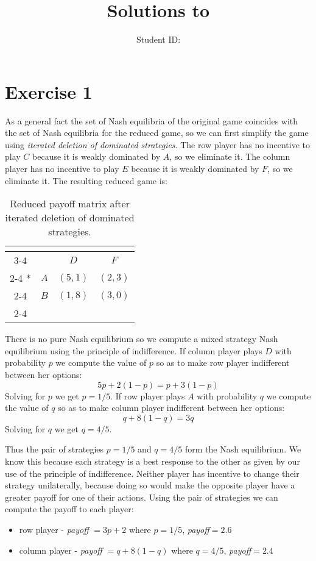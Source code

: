 \documentclass{article}
\title{\textbf{Solutions to \exerciseset}}
\author{\studentname \qquad Student ID: \uwid}
\begin{document}
\maketitle

\section*{Exercise 1}

As a general fact the set of Nash equilibria of the original game coincides with the set of Nash equilibria for the reduced game, so we can first simplify the game using \emph{iterated deletion of dominated strategies}. The row player has no incentive to play $C$ because it is weakly dominated by $A$, so we eliminate it. The column player has no incentive to play $E$ because it is weakly dominated by $F$, so we eliminate it. The resulting reduced game is:

\begin{table}[H]
\centering
  \setlength{\extrarowheight}{2pt}
  \begin{tabular}{*{4}{c|}}
    \multicolumn{2}{c}{} & \multicolumn{2}{c}{}\\\cline{3-4}
    \multicolumn{1}{c}{} &  & $D$  & $F$ \\\cline{2-4}
    \multirow{2}*{}  & $A$ & $(5,1)$ & $(2,3)$ \\\cline{2-4}
    & $B$ & $(1,8)$ & $(3,0)$ \\\cline{2-4}
  \end{tabular}
\caption{Reduced payoff matrix after iterated deletion of dominated strategies.}
\end{table}

There is no pure Nash equilibrium so we compute a mixed strategy Nash equilibrium using the principle of indifference.
If column player plays $D$ with probability $p$ we compute the value of $p$ so as to make row player indifferent between her options:
\[ 5p + 2(1 - p) = p + 3(1 - p) \]
Solving for $p$ we get $p = 1/5$. If row player plays $A$ with probability $q$ we compute the value of $q$ so as to make column player indifferent between her options:
\[ q + 8(1 - q) = 3q \]
Solving for $q$ we get $q = 4/5$.

Thus the pair of strategies $p = 1/5$ and $q = 4/5$ form the Nash equilibrium. We know this because each strategy is a best response to the other as given by our use of the principle of indifference. Neither player has incentive to change their strategy unilaterally, because doing so would make the opposite player have a greater payoff for one of their actions. Using the pair of strategies we can compute the payoff to each player:
\begin{itemize}
    \item row player - \emph{payoff} $= 3p + 2$ where $p = 1/5$, \emph{payoff}$= 2.6$
    \item column player - \emph{payoff} $= q + 8(1 - q)$ where $q = 4/5$, \emph{payoff}$= 2.4$
\end{itemize}
\end{document}
